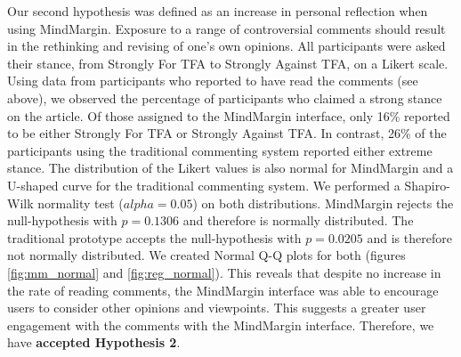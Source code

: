 Our second hypothesis was defined as an increase in personal reflection when using MindMargin. Exposure to a range of controversial comments should result in the rethinking and revising of one’s own opinions. All participants were asked their stance, from Strongly For TFA to Strongly Against TFA, on a Likert scale. Using data from participants who reported to have read the comments (see above), we observed the percentage of participants who claimed a strong stance on the article. Of those assigned to the MindMargin interface, only 16\% reported to be either Strongly For TFA or Strongly Against TFA. In contrast, 26\% of the participants using the traditional commenting system reported either extreme stance. The distribution of the Likert values is also normal for MindMargin and a U-shaped curve for the traditional commenting system. We performed a Shapiro-Wilk normality test ($alpha=0.05$) on both distributions. MindMargin rejects the null-hypothesis with $p=0.1306$ and therefore is normally distributed. The traditional prototype accepts the null-hypothesis with $p=0.0205$ and is therefore not normally distributed. We created Normal Q-Q plots for both (figures \ref{fig:mm_normal} and \ref{fig:reg_normal}). This reveals that despite no increase in the rate of reading comments, the MindMargin interface was able to encourage users to consider other opinions and viewpoints. This suggests a greater user engagement with the comments with the MindMargin interface. Therefore, we have \textbf{accepted Hypothesis 2}.

